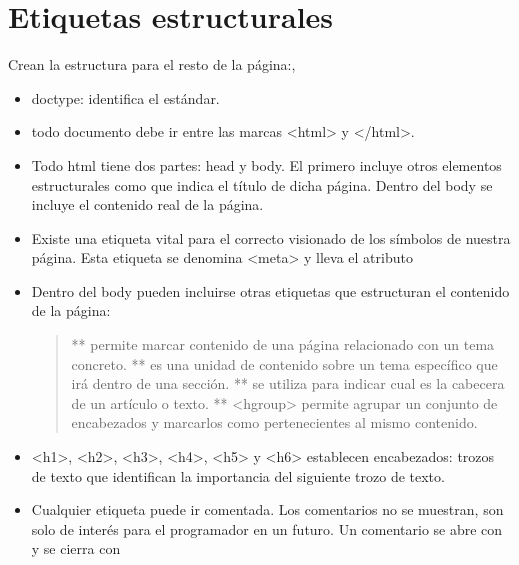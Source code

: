 \documentclass[letterpaper,10pt,spanish]{sphinxmanual}
\begin{document}
\section{Etiquetas estructurales}
\label{tema2:etiquetas-estructurales}
Crean la estructura para el resto de la página:,
\begin{itemize}
\item {} 
doctype: identifica el estándar.

\item {} 
todo documento debe ir entre las marcas \textless{}html\textgreater{} y \textless{}/html\textgreater{}.

\item {} 
Todo html tiene dos partes: head y body. El primero incluye otros elementos estructurales como  que indica el título de dicha página. Dentro del body se incluye el contenido real de la página.

\item {} 
Existe una etiqueta vital para el correcto visionado de los símbolos de nuestra página. Esta etiqueta se denomina \textless{}meta\textgreater{} y lleva el atributo 

\item {} 
Dentro del body pueden incluirse otras etiquetas que estructuran el contenido de la página:
\begin{quote}

**  permite marcar contenido de una página relacionado con un tema concreto.
**  es una unidad de contenido sobre un tema específico que irá dentro de una sección.
**  se utiliza para indicar cual es la cabecera de un artículo o texto.
**  \textless{}hgroup\textgreater{} permite agrupar un conjunto de encabezados y marcarlos como pertenecientes al mismo contenido.
\end{quote}

\item {} 
\textless{}h1\textgreater{}, \textless{}h2\textgreater{}, \textless{}h3\textgreater{}, \textless{}h4\textgreater{}, \textless{}h5\textgreater{} y \textless{}h6\textgreater{} establecen encabezados: trozos de texto que identifican la importancia del siguiente trozo de texto.

\item {} 
Cualquier etiqueta puede ir comentada. Los comentarios no se muestran, son solo de interés para el programador en un futuro. Un comentario se abre con \sphinxcode{\textless{}!-{-}} y se cierra con \sphinxcode{-{-}\textgreater{}}


\end{itemize}
\end{document}
